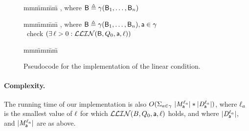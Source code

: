 \begin{figure}[H]
\setcounter{lctr}{0}
\begin{tabbing}\label{alg:check-df}
mm\= mm\= mm\= \kill
{},  where $\mathsf{B} \triangleq \gamma(\mathsf{B}_1,\dots,\mathsf{B}_n)$\\
\lio{\ENDFOR;}
\end{tabbing}

\setcounter{lctr}{0}
\begin{tabbing}\label{alg:checkInt}
mm\= mm\= mm\= \kill
{},  where $\mathsf{B} \triangleq \gamma(\mathsf{B}_1,\dots,\mathsf{B}_n), \mathsf{a} \in \gamma$\\
\cmnt\ check $(\exists\, \ell > 0: \mathcal{LLIN}(\mathsf{B}, Q_0, \mathsf{a}, \ell))$\\
\lio{\WHILEC{\ttt}}
\lio{\ENDWHILE}
\end{tabbing}

\setcounter{lctr}{0}
\begin{tabbing}
\label{alg:eval-ldfc}
mm\= mm\= mm\= \kill
{}\\
  \lit{\FI}
\lio{\ENDFOR;}
\end{tabbing}

\caption{Pseudocode for the implementation of the linear condition.}
\label{fig:implementation}
\label{fig:implementation-checkDF}
\end{figure}

\paragraph{Complexity.} The running  time of our implementation is
also 
$O(\Sigma_{a \in \gamma}\ |\mathit{M}_{\mathsf{a}}^{\ell_a}| * |\mathit{D}_{\mathsf{a}}^{\ell_a}|)$,
where $\ell_a$ is the smallest value of $\ell$ for which $\mathcal{LLIN}(B, Q_0, \mathsf{a}, \ell)$ holds, and where
$|\mathit{D}_{\mathsf{a}}^{\ell_a}|$, and $|\mathit{M}_{\mathsf{a}}^{\ell_a}|$ are as above.